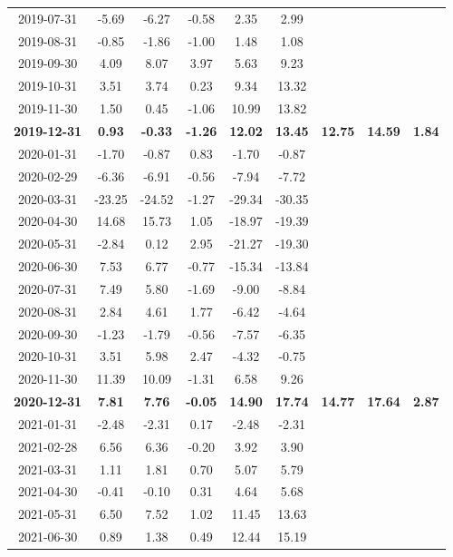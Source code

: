 \begin{longtable}{ccccccccc}
2019-07-31 & -5.69 & -6.27 & -0.58 & 2.35 & 2.99 &  &  &  \\
2019-08-31 & -0.85 & -1.86 & -1.00 & 1.48 & 1.08 &  &  &  \\
2019-09-30 & 4.09 & 8.07 & 3.97 & 5.63 & 9.23 &  &  &  \\
2019-10-31 & 3.51 & 3.74 & 0.23 & 9.34 & 13.32 &  &  &  \\
2019-11-30 & 1.50 & 0.45 & -1.06 & 10.99 & 13.82 &  &  &  \\
\textbf{2019-12-31} & \textbf{0.93} & \textbf{-0.33} & \textbf{-1.26} & \textbf{12.02} & \textbf{13.45} & \textbf{12.75} & \textbf{14.59} & \textbf{1.84} \\
\midrule
2020-01-31 & -1.70 & -0.87 & 0.83 & -1.70 & -0.87 &  &  &  \\
2020-02-29 & -6.36 & -6.91 & -0.56 & -7.94 & -7.72 &  &  &  \\
2020-03-31 & -23.25 & -24.52 & -1.27 & -29.34 & -30.35 &  &  &  \\
2020-04-30 & 14.68 & 15.73 & 1.05 & -18.97 & -19.39 &  &  &  \\
2020-05-31 & -2.84 & 0.12 & 2.95 & -21.27 & -19.30 &  &  &  \\
2020-06-30 & 7.53 & 6.77 & -0.77 & -15.34 & -13.84 &  &  &  \\
2020-07-31 & 7.49 & 5.80 & -1.69 & -9.00 & -8.84 &  &  &  \\
2020-08-31 & 2.84 & 4.61 & 1.77 & -6.42 & -4.64 &  &  &  \\
2020-09-30 & -1.23 & -1.79 & -0.56 & -7.57 & -6.35 &  &  &  \\
2020-10-31 & 3.51 & 5.98 & 2.47 & -4.32 & -0.75 &  &  &  \\
2020-11-30 & 11.39 & 10.09 & -1.31 & 6.58 & 9.26 &  &  &  \\
\textbf{2020-12-31} & \textbf{7.81} & \textbf{7.76} & \textbf{-0.05} & \textbf{14.90} & \textbf{17.74} & \textbf{14.77} & \textbf{17.64} & \textbf{2.87} \\
\midrule
2021-01-31 & -2.48 & -2.31 & 0.17 & -2.48 & -2.31 &  &  &  \\
2021-02-28 & 6.56 & 6.36 & -0.20 & 3.92 & 3.90 &  &  &  \\
2021-03-31 & 1.11 & 1.81 & 0.70 & 5.07 & 5.79 &  &  &  \\
2021-04-30 & -0.41 & -0.10 & 0.31 & 4.64 & 5.68 &  &  &  \\
2021-05-31 & 6.50 & 7.52 & 1.02 & 11.45 & 13.63 &  &  &  \\
2021-06-30 & 0.89 & 1.38 & 0.49 & 12.44 & 15.19 &  &  &  \\

\end{longtable}
